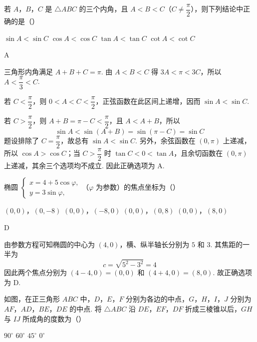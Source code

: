 \begin{problem}
若 \(A\)，\(B\)，\(C\) 是 \(\triangle ABC\) 的三个内角，且 \(A<B<C\)（\(C\ne\dfrac\pi2\)），则下列结论中正确的是（\quad）

\choices
    {\(\sin A<\sin C\)}
    {\(\cos A<\cos C\)}
    {\(\tan A<\tan C\)}
    {\(\cot A<\cot C\)}
\end{problem}

\begin{answer}
A
\end{answer}

\begin{solution}
三角形内角满足 \(A+B+C=\pi\). 由 \(A<B<C\) 得 \(3A<\pi<3C\)，所以 \(A<\dfrac\pi3<C\).

若 \(C<\dfrac\pi2\)，则 \(0<A<C<\dfrac\pi2\)，正弦函数在此区间上递增，因而 \(\sin A<\sin C\).

若 \(C>\dfrac\pi2\)，则 \(A+B=\pi-C<\dfrac\pi2\)，且 \(A<A+B\)，所以
\[
\sin A<\sin(A+B)=\sin(\pi-C)=\sin C
\]
题设排除了 \(C=\dfrac\pi2\)，故总有 \(\sin A<\sin C\). 另外，余弦函数在 \((0,\pi)\) 上递减，所以 \(\cos A>\cos C\)；当 \(C>\dfrac\pi2\) 时 \(\tan C<0<\tan A\)，且余切函数在 \((0,\pi)\) 上递减，其余三个选项均不成立. 因此正确选项为 A.
\end{solution}

\begin{problem}
椭圆
\(\begin{cases}
x=4+5\cos\varphi,\\
y=3\sin\varphi,
\end{cases}\)（\(\varphi\) 为参数）的焦点坐标为（\quad）

\choices
    {\((0,0)\)，\((0,-8)\)}
    {\((0,0)\)，\((-8,0)\)}
    {\((0,0)\)，\((0,8)\)}
    {\((0,0)\)，\((8,0)\)}
\end{problem}

\begin{answer}
D
\end{answer}

\begin{solution}
由参数方程可知椭圆的中心为 \((4,0)\)，横、纵半轴长分别为 \(5\) 和 \(3\). 其焦距的一半为
\[
c=\sqrt{5^{2}-3^{2}}=4
\]
因此两个焦点分别为 \((4-4,0)=(0,0)\) 和 \((4+4,0)=(8,0)\).
故正确选项为 D.
\end{solution}

\begin{problem}
如图，在正三角形 \(ABC\) 中，\(D\)，\(E\)，\(F\) 分别为各边的中点，\(G\)，\(H\)，\(I\)，\(J\) 分别为 \(AF\)，\(AD\)，\(BE\)，\(DE\) 的中点. 将 \(\triangle ABC\) 沿 \(DE\)，\(EF\)，\(DF\) 折成三棱锥以后，\(GH\) 与 \(IJ\) 所成角的度数为（\quad）


\choices
    {\(90^{\circ}\)}
    {\(60^{\circ}\)}
    {\(45^{\circ}\)}
    {\(0^{\circ}\)}
\end{problem}

